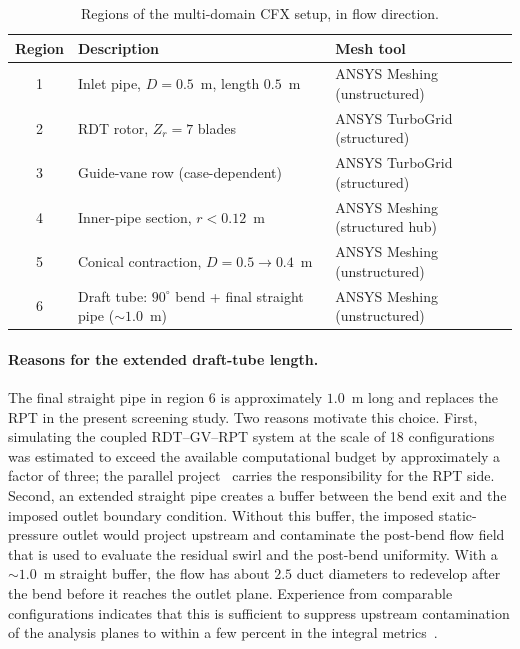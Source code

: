 \begin{table}[h!]
  \centering
  \caption[Domain regions]{Regions of the multi-domain CFX setup, in flow direction.}
  \label{tab:domains}
  \small
  \begin{tabular}{c|l|l}
    \toprule
    \textbf{Region} & \textbf{Description} & \textbf{Mesh tool} \\
    \midrule
    1 & Inlet pipe, $D = 0.5$~m, length $0.5$~m   & ANSYS Meshing (unstructured) \\
    2 & RDT rotor, $Z_r = 7$ blades              & ANSYS TurboGrid (structured) \\
    3 & Guide-vane row (case-dependent)          & ANSYS TurboGrid (structured) \\
    4 & Inner-pipe section, $r < 0.12$~m         & ANSYS Meshing (structured hub) \\
    5 & Conical contraction, $D = 0.5 \to 0.4$~m & ANSYS Meshing (unstructured) \\
    6 & Draft tube: $90^\circ$ bend + final straight pipe ($\sim 1.0$~m) & ANSYS Meshing (unstructured) \\
    \bottomrule
  \end{tabular}
\end{table}
 
\paragraph{Reasons for the extended draft-tube length.}
The final straight pipe in region 6 is approximately $1.0$~m long and replaces the RPT in the present screening study. Two reasons motivate this choice. First, simulating the coupled RDT--GV--RPT system at the scale of 18 configurations was estimated to exceed the available computational budget by approximately a factor of three; the parallel project~\cite{Dokset2025} carries the responsibility for the RPT side. Second, an extended straight pipe creates a buffer between the bend exit and the imposed outlet boundary condition. Without this buffer, the imposed static-pressure outlet would project upstream and contaminate the post-bend flow field that is used to evaluate the residual swirl and the post-bend uniformity. With a $\sim 1.0$~m straight buffer, the flow has about $2.5$ duct diameters to redevelop after the bend before it reaches the outlet plane. Experience from comparable configurations indicates that this is sufficient to suppress upstream contamination of the analysis planes to within a few percent in the integral metrics~\cite{Xia1997}.
 
